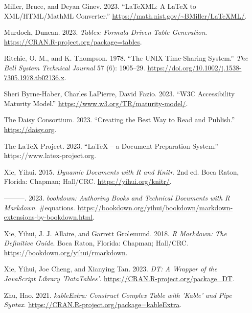 \begin{CSLReferences}{1}{0}
\leavevmode{}%
Miller, Bruce, and Deyan Ginev. 2023. {``{LaTeXML}: A {LaTeX} to {XML/HTML/MathML} Converter.''} \url{https://math.nist.gov/~BMiller/LaTeXML/}.

\leavevmode{}%
Murdoch, Duncan. 2023. \emph{Tables: Formula-Driven Table Generation}. \url{https://CRAN.R-project.org/package=tables}.

\leavevmode{}%
Ritchie, O. M., and K. Thompson. 1978. {``The UNIX Time-Sharing System.''} \emph{The Bell System Technical Journal} 57 (6): 1905--29. \url{https://doi.org/10.1002/j.1538-7305.1978.tb02136.x}.

\leavevmode{}%
Sheri Byrne-Haber, Charles LaPierre, David Fazio. 2023. {``W3C Accessibility Maturity Model.''} \url{https://www.w3.org/TR/maturity-model/}.

\leavevmode{}%
The Daisy Consortium. 2023. {``Creating the Best Way to Read and Publish.''} \url{https://daisy.org}.

\leavevmode{}%
The LaTeX Project. 2023. {``LaTeX -- a Document Preparation System.''} https://www.latex-project.org.

\leavevmode{}%
Xie, Yihui. 2015. \emph{Dynamic Documents with {R} and Knitr}. 2nd ed. Boca Raton, Florida: Chapman; Hall/CRC. \url{https://yihui.org/knitr/}.

\leavevmode{}%
---------. 2023. \emph{{bookdown: Authoring Books and Technical Documents with R Markdown}}. \#equations. \url{https://bookdown.org/yihui/bookdown/markdown-extensions-by-bookdown.html}.

\leavevmode{}%
Xie, Yihui, J. J. Allaire, and Garrett Grolemund. 2018. \emph{R Markdown: The Definitive Guide}. Boca Raton, Florida: Chapman; Hall/CRC. \url{https://bookdown.org/yihui/rmarkdown}.

\leavevmode{}%
Xie, Yihui, Joe Cheng, and Xianying Tan. 2023. \emph{DT: A Wrapper of the JavaScript Library 'DataTables'}. \url{https://CRAN.R-project.org/package=DT}.

\leavevmode{}%
Zhu, Hao. 2021. \emph{kableExtra: Construct Complex Table with 'Kable' and Pipe Syntax}. \url{https://CRAN.R-project.org/package=kableExtra}.

\end{CSLReferences}

